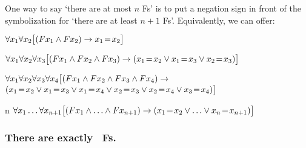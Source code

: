 One way to say `there are at most $n$ Fs' is to put a negation sign in front of the symbolization for `there are at least $n+1$ Fs'. Equivalently, we can offer:
\begin{ekey}
	\item[\text{one}] $\forall x_1\forall x_2\bigl[(Fx_1 \mathbin{\wedge} Fx_2) \rightarrow x_1\!=\! x_2\bigr]$
	\item[\text{two}] $\forall x_1\forall x_2\forall x_3\bigl[(Fx_1 \mathbin{\wedge} Fx_2 \mathbin{\wedge} Fx_3) \rightarrow (x_1\!=\! x_2 \vee x_1\!=\! x_3 \vee x_2\!=\! x_3)\bigr]$
	\item[\text{three}] $\forall x_1\forall x_2\forall x_3\forall x_4\bigl[(Fx_1 \mathbin{\wedge} Fx_2 \mathbin{\wedge} Fx_3 \mathbin{\wedge} Fx_4) \rightarrow \phantom{.}$\\
	\phantom{$\exists x_1 \exists x_2$}$(x_1\eid x_2 \eor x_1\eid x_3 \eor x_1\eid x_4 \eor x_2\eid x_3 \eor x_2\eid x_4 \eor x_3\eid x_4)\bigr]$
	\item[n]$\forall x_1\ldots\forall x_{n+1}
	\bigl[(Fx_1\mathbin{\wedge} \ldots \mathbin{\wedge} Fx_{n+1}) \rightarrow (x_1\!=\! x_2 \vee \ldots \vee x_n\!=\! x_{n+1})\bigr]$ 
\end{ekey}

\subsubsection*{There are exactly \blank\ Fs.}
\label{summary.exactly}

